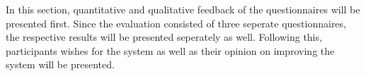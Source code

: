 In this section, quantitative and qualitative feedback of the questionnaires 
will be presented first.
Since the evaluation consisted of three seperate questionnaires, 
the respective results will be presented seperately as well.
Following this, participants wishes for the system as well as their opinion 
on improving the system will be presented.


